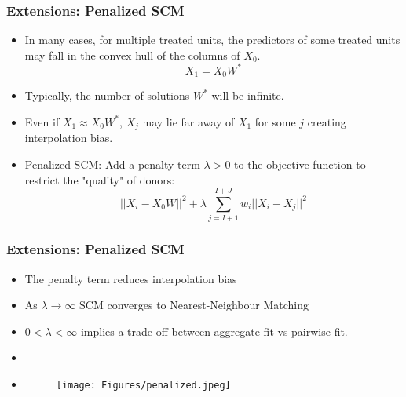 \documentclass[xcolor=svgnames,t]{beamer}
\newcommand{\witem}{\item[\textcolor{white}{$\bullet$}]}
\begin{document}
\begin{frame}
    \frametitle{Extensions: Penalized SCM}
    \begin{itemize}
        \item<1-> In many cases, for multiple treated units, the predictors of some treated units may fall in the convex hull of the columns of $X_0$. $$X_1=X_0W^*$$
        \item <2-> Typically, the number of solutions $W^*$ will be infinite.
        \item <3-> Even if $X_1 \approx X_0W^*$, $X_j$ may lie far away of $X_1$ for some $j$ creating interpolation bias.
        \item <4-> Penalized SCM: Add a penalty term $\lambda>0$ to the objective function to restrict the "quality" of donors:
        $$||X_i-X_0 W ||^2 + \lambda \sum^{I+J}_{j=I+1} w_i || X_i -X_j ||^2 $$
    \end{itemize}
\end{frame}
\begin{frame}
    \frametitle{Extensions: Penalized SCM}
    \begin{itemize}
        \item<1-> The penalty term reduces interpolation bias
        \item <2-> As $\lambda\rightarrow \infty$ SCM converges to Nearest-Neighbour Matching 
        \item <3-> $0< \lambda < \infty$ implies a trade-off between aggregate fit vs pairwise fit.
        \witem <4-> 
            \witem<5->
            \begin{figure}[htbp]
                \centering
                \texttt{[image: Figures/penalized.jpeg]}
               
            \end{figure}
    \end{itemize}
\end{frame}
\end{document}
